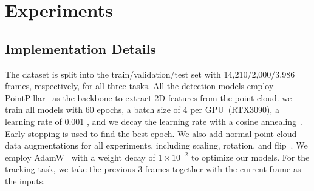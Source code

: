 \documentclass[10pt,twocolumn,letterpaper]{article}
\begin{document}


\section{Experiments}
\subsection{Implementation Details}
The dataset is split into the train/validation/test set with 14,210/2,000/3,986 frames, respectively, for all three tasks. All the detection models employ PointPillar~\cite{lang2019pointpillars} as the backbone to extract 2D features from the point cloud. we train all models with 60 epochs, a batch size of 4 per GPU~(RTX3090), a learning rate of 0.001
, and we decay the learning rate with a cosine annealing~\cite{loshchilov2017decoupled}. Early stopping is used to find the best epoch.  We also add normal point cloud data augmentations for all experiments, including scaling, rotation, and flip~\cite{lang2019pointpillars}.  We employ AdamW~\cite{kingma2014adam} with a weight decay of $1\times 10^{-2}$ to optimize our models. For the tracking task, we take the  previous 3 frames together with the current frame as the inputs.
\end{document}
